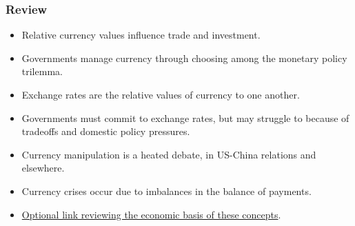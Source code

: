 \documentclass[handout]{beamer}
\begin{document}
\begin{frame} 
	\frametitle{\LARGE{Review}}
	\begin{itemize}
		
			\item Relative currency values influence trade and investment. \pause  

			\item Governments manage currency through choosing among the monetary policy trilemma.  \pause

			\item Exchange rates are the relative values of currency to one another. \pause 

			\item Governments must commit to exchange rates, but may struggle to because of tradeoffs and domestic policy pressures. \pause 

			\item Currency manipulation is a heated debate, in US-China relations and elsewhere.
			
			\item Currency crises occur due to imbalances in the balance of payments.
			
			\item \href{https://www.youtube.com/watch?v=geoe-6NBy10}{Optional link reviewing the economic basis of these concepts}.
			

			
	
	\end{itemize}
\end{frame}
\end{document}
